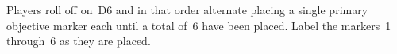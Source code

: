 

\begin{tablesetup}    
  \vanguardstrike

  \smallskip%
  Players roll off on~D6 and in that order alternate placing a single
  primary objective marker each until a total of~6 have been placed.
  Label the markers~1 through~6 as they are placed.
\end{tablesetup}

\begin{missionrules}
\standingorders
\end{missionrules}


\begin{scoring}
  
\begin{primaries}
  \maelstromscoring
\end{primaries}

\end{scoring}

\clearpage
\squelchbackground

\pagebreak
\restorebackground
